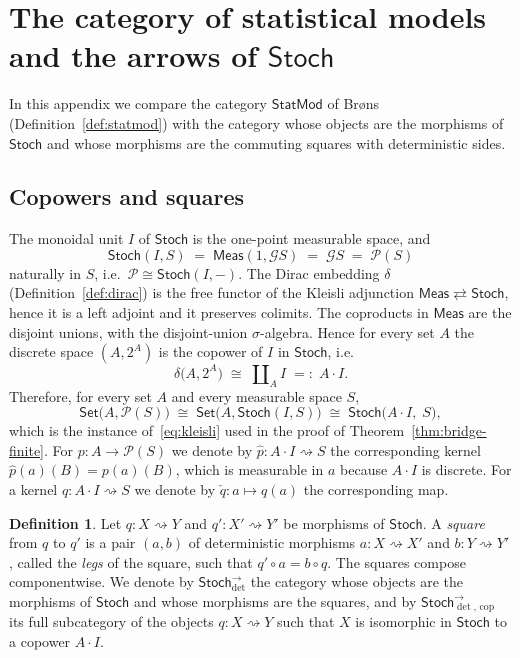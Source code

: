\documentclass[11pt,a4paper]{article}
\theoremstyle{plain}
\theoremstyle{definition}
\newtheorem{definition}[theorem]{Definition}
\theoremstyle{remark}
\newcommand{\cat}[1]{\mathsf{#1}}
\newcommand{\Meas}{\cat{Meas}}
\newcommand{\Set}{\cat{Set}}
\newcommand{\Stoch}{\cat{Stoch}}
\newcommand{\G}{\mathcal{G}}
\newcommand{\Prb}{\mathcal{P}}
\newcommand{\del}{\delta}
\newcommand{\StatMod}{\cat{StatMod}}
\newcommand{\Arrdet}[1]{#1^{\rightarrow}_{\det}}
\newcommand{\Arrcop}[1]{#1^{\rightarrow}_{\det,\,\mathrm{cop}}}
\begin{document}
\appendix
\section{The category of statistical models and the arrows of
\texorpdfstring{$\Stoch$}{Stoch}}\label{sec:Bref}

In this appendix we compare the category $\StatMod$ of Br\o ns
(Definition~\ref{def:statmod}) with the category whose objects are the
morphisms of $\Stoch$ and whose morphisms are the commuting squares with
deterministic sides.

\subsection{Copowers and squares}

The monoidal unit $I$ of $\Stoch$ is the one-point measurable space, and
\[
\Stoch(I,S) \;=\; \Meas(1,\G S) \;=\; \G S \;=\; \Prb(S)
\]
naturally in $S$, i.e.\ $\Prb \cong \Stoch(I,-)$. The Dirac embedding $\del$
(Definition~\ref{def:dirac}) is the free functor of the Kleisli adjunction
$\Meas \rightleftarrows \Stoch$, hence it is a left adjoint and it preserves
colimits. The coproducts in $\Meas$ are the disjoint unions, with the
disjoint-union $\sigma$-algebra. Hence for every set $A$ the discrete space
$(A,2^{A})$ is the copower of $I$ in $\Stoch$, i.e.
\[
\del\bigl(A,2^A \bigr) \;\cong\; \coprod\nolimits_{A} I \;=:\; A\cdot I .
\]
Therefore, for every set $A$ and every measurable space $S$,
\begin{equation}\label{eq:copower}
\Set\bigl(A,\Prb(S)\bigr)
\;\cong\;
\Set\bigl(A,\Stoch(I,S)\bigr)
\;\cong\;
\Stoch\bigl(A\cdot I,\;S\bigr),
\end{equation}
which is the instance of~\eqref{eq:kleisli} used in the proof of
Theorem~\ref{thm:bridge-finite}. For $p \colon A \to \Prb(S)$ we denote by
$\widehat{p} \colon A \cdot I \rightsquigarrow S$ the corresponding kernel
$\widehat{p}(a)(B) = p(a)(B)$, which is measurable in $a$ because $A \cdot I$ is
discrete. For a kernel $q \colon A \cdot I \rightsquigarrow S$ we denote by
$\check{q} \colon a \mapsto q(a)$ the corresponding map.

\begin{definition}\label{def:arrdet}
Let $q \colon X \rightsquigarrow Y$ and $q' \colon X' \rightsquigarrow Y'$ be
morphisms of $\Stoch$. A \emph{square} from $q$ to $q'$ is a pair $(a,b)$ of
deterministic morphisms $a \colon X \rightsquigarrow X'$ and
$b \colon Y \rightsquigarrow Y'$, called the \emph{legs} of the square, such
that $q' \circ a = b \circ q$. The squares compose componentwise. We denote by
$\Arrdet{\Stoch}$ the category whose objects are the morphisms of $\Stoch$ and
whose morphisms are the squares, and by $\Arrcop{\Stoch}$ its full subcategory
of the objects $q \colon X \rightsquigarrow Y$ such that $X$ is isomorphic in
$\Stoch$ to a copower $A \cdot I$.
\end{definition}
\end{document}
